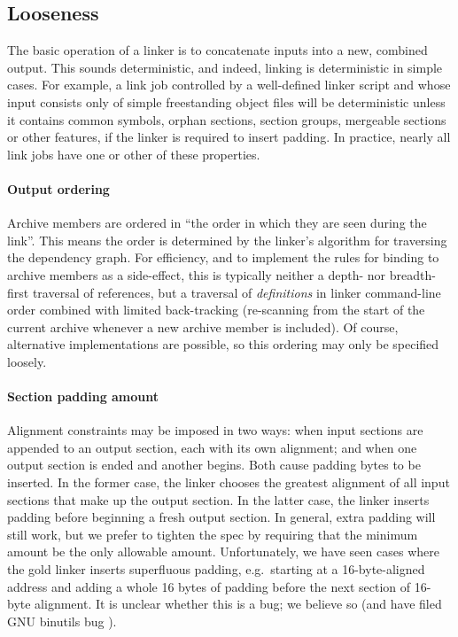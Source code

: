 
\subsection{Looseness}

The basic operation of a linker is to concatenate inputs 
into a new, combined output. 
This sounds deterministic, and indeed, linking is deterministic in simple cases.
For example, a link job controlled by a well-defined linker script
and whose input consists only of simple freestanding object files
will be deterministic
unless it contains common symbols, 
orphan sections, section groups, mergeable sections or other features,
if the linker is required to insert padding.
In practice, nearly all link jobs have one or other of these properties.

\paragraph{Output ordering}
Archive members are ordered in ``the order in which they are seen during the link''.
This means the order is determined by the linker's algorithm for
traversing the dependency graph. 
For efficiency, 
and to implement the rules for binding to archive members as a side-effect, 
this is typically neither a depth- nor breadth-first traversal of references,
but a traversal of \emph{definitions} in linker command-line order
combined with limited back-tracking 
(re-scanning from the start of the current archive whenever a new archive
member is included).
Of course, alternative implementations are possible, 
so this ordering may only be specified loosely.

\paragraph{Section padding amount}
Alignment constraints may be imposed 
in two ways: when input sections are appended to an output section, 
each with its own alignment; 
and when one output section is ended and another begins.
Both cause padding bytes to be inserted. 
In the former case, the linker chooses the greatest alignment of all input sections
that make up the output section.
In the latter case, the linker inserts padding before beginning a fresh output section.
In general, extra padding will still work, but 
we prefer to tighten the spec 
by requiring that the minimum amount be the only allowable amount.
Unfortunately, we have seen cases where the \textsf{gold} linker inserts
superfluous padding, e.g.\ starting at a 16-byte-aligned address
and adding a whole 16 bytes of padding
before the next section of 16-byte alignment.
It is unclear whether this is a bug; 
we believe so (and have filed GNU binutils bug ).

